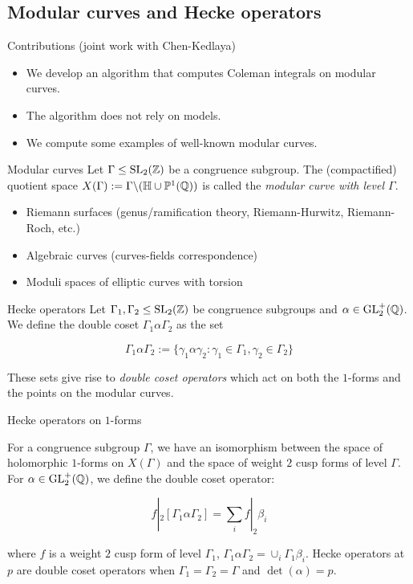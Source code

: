 \subsection{Modular curves and Hecke operators}

\begin{frame}{Contributions (joint work with Chen-Kedlaya)}
\begin{itemize}
\item We develop an algorithm that computes Coleman integrals on modular curves.
\item The algorithm does not rely on models.
\item We compute some examples of well-known modular curves.
\end{itemize}
\end{frame}

\begin{frame}{Modular curves}
Let $\Gamma \leq \operatorname{SL}_2(\mathbb{Z})$ be a congruence subgroup. The (compactified) quotient space $X(\Gamma) := \Gamma \backslash (\mathbb{H} \cup \mathbb{P}^1(\mathbb{Q}))$ is called the \textit{modular curve with level $\Gamma$}.

\begin{itemize}
\item Riemann surfaces (genus/ramification theory, Riemann-Hurwitz, Riemann-Roch, etc.)
\item Algebraic curves (curves-fields correspondence)
\item Moduli spaces of elliptic curves with torsion
\end{itemize}

\end{frame}

\begin{frame}{Hecke operators}
Let $\Gamma_1,\Gamma_2 \leq \operatorname{SL}_2(\mathbb{Z})$ be congruence subgroups and $\alpha \in \operatorname{GL}_2^+(\mathbb{Q})$. We define the double coset $\Gamma_1 \alpha \Gamma_2$ as the set

\[
\Gamma_1 \alpha \Gamma_2 := \{ \gamma_1 \alpha \gamma_2: \gamma_1 \in \Gamma_1, \gamma_2 \in \Gamma_2 \}
\]

These sets give rise to \textit{double coset operators} which act on both the $1$-forms and the points on the modular curves.

\end{frame}

\begin{frame}{Hecke operators on $1$-forms}

For a congruence subgroup $\Gamma$, we have an isomorphism between the space of holomorphic $1$-forms on $X(\Gamma)$ and the space of weight $2$ cusp forms of level $\Gamma$. For $\alpha \in \operatorname{GL}_2^+(\mathbb{Q})$, we define the double coset operator:

\[
f|_2 [\Gamma_1 \alpha \Gamma_2] = \sum_i f|_2 \beta_i
\]

where $f$ is a weight $2$ cusp form of level $\Gamma_1$, $\Gamma_1 \alpha \Gamma_2 = \cup_i \Gamma_1 \beta_i$. Hecke operators at $p$ are double coset operators when $\Gamma_1= \Gamma_2 = \Gamma$ and $\det(\alpha) = p$.

\end{frame}

